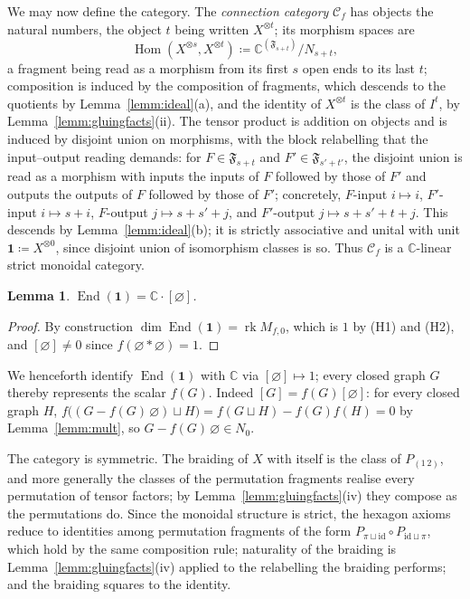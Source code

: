\documentclass[11pt]{article}
\newtheorem{lemm}[theo]{Lemma}
\newcommand{\emptygraph}{\varnothing}
\newcommand{\Frag}[1]{\mathfrak{F}_{#1}}          %
\newcommand{\connmat}[2]{M_{#1,#2}}               %
\newcommand{\glue}{\ast}                          %
\newcommand{\strand}{I}                           %
\newcommand{\conncat}{\mathcal{C}_{f}}            %
\newcommand{\unitobj}{\mathbf{1}}                 %
\newcommand{\genX}{X}                             %
\newcommand{\End}{\operatorname{End}}
\newcommand{\Hom}{\operatorname{Hom}}
\newcommand{\rk}{\operatorname{rk}}
\begin{document}
We may now define the category. The \emph{connection category}
$\conncat$ has objects the natural numbers, the object $t$ being
written $\genX^{\otimes t}$; its morphism spaces are
\[
\Hom(\genX^{\otimes s},\genX^{\otimes t})
\coloneqq\mathbb{C}^{(\Frag{s+t})}/N_{s+t},
\]
a fragment being read as a morphism from its first $s$ open ends to
its last $t$; composition is induced by the composition of
fragments, which descends to the quotients by
Lemma~\ref{lemm:ideal}(a), and the identity of $\genX^{\otimes t}$
is the class of $\strand^{t}$, by Lemma~\ref{lemm:gluingfacts}(ii).
The tensor product is addition on objects and is induced by
disjoint union on morphisms, with the block relabelling that the
input--output reading demands: for $F\in\Frag{s+t}$ and
$F'\in\Frag{s'+t'}$, the disjoint union is read as a morphism with
inputs the inputs of $F$ followed by those of $F'$ and outputs the
outputs of $F$ followed by those of $F'$; concretely, $F$-input
$i\mapsto i$, $F'$-input $i\mapsto s+i$, $F$-output
$j\mapsto s+s'+j$, and $F'$-output $j\mapsto s+s'+t+j$. This
descends by Lemma~\ref{lemm:ideal}(b); it is
strictly associative and unital with unit
$\unitobj\coloneqq\genX^{\otimes 0}$, since disjoint union of
isomorphism classes is so. Thus $\conncat$ is a
$\mathbb{C}$-linear strict monoidal category.

\begin{lemm}\label{lemm:simpleunit}
$\End(\unitobj)=\mathbb{C}\cdot[\emptygraph]$.
\end{lemm}

\begin{proof}
By construction
$\dim\End(\unitobj)=\rk\connmat{f}{0}$, which is $1$ by (H1) and
(H2), and $[\emptygraph]\ne 0$ since
$f(\emptygraph\glue\emptygraph)=1$.
\end{proof}

We henceforth identify $\End(\unitobj)$ with $\mathbb{C}$ via
$[\emptygraph]\mapsto 1$; every closed graph $G$ thereby represents
the scalar $f(G)$. Indeed $[G]=f(G)[\emptygraph]$: for every
closed graph $H$,
$f\bigl((G-f(G)\,\emptygraph)\sqcup H\bigr)
=f(G\sqcup H)-f(G)f(H)=0$ by Lemma~\ref{lemm:mult}, so
$G-f(G)\,\emptygraph\in N_{0}$.

The category is symmetric. The braiding of $\genX$ with itself is
the class of $P_{(1\,2)}$, and more generally the classes of the
permutation fragments realise every permutation of tensor factors;
by Lemma~\ref{lemm:gluingfacts}(iv) they compose as the permutations
do. Since the monoidal structure is strict, the hexagon axioms
reduce to identities among permutation fragments of the form
$P_{\pi\sqcup\mathrm{id}}\circ P_{\mathrm{id}\sqcup\pi}$, which hold
by the same composition rule; naturality of the braiding is
Lemma~\ref{lemm:gluingfacts}(iv) applied to the relabelling the
braiding performs; and the braiding squares to the identity.
\end{document}
